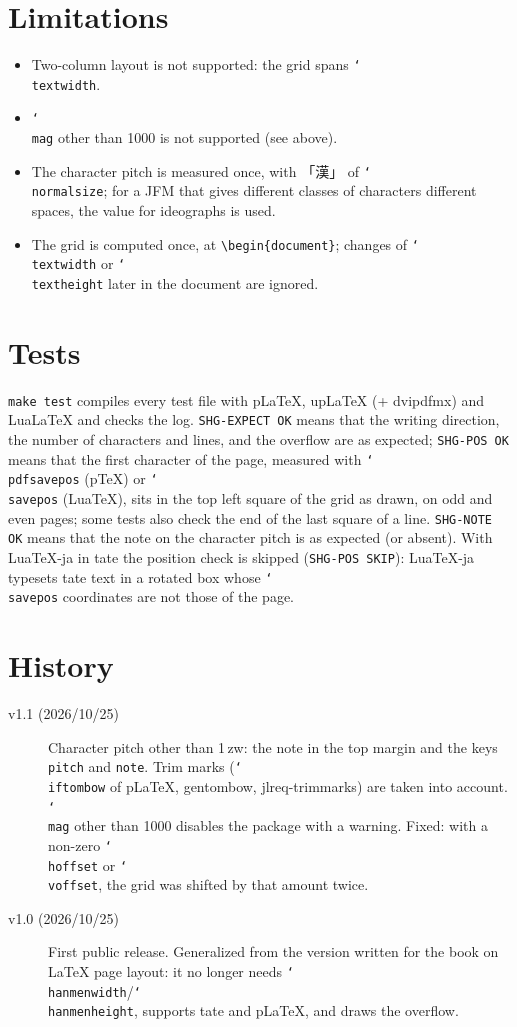 \documentclass{article}
\newcommand*\cs[1]{\texttt{\char`\\#1}}
\newcommand*\key[1]{\texttt{#1}}
\begin{document}
\section{Limitations}

\begin{itemize}
\item Two-column layout is not supported: the grid spans \cs{textwidth}.
\item \cs{mag} other than 1000 is not supported (see above).
\item The character pitch is measured once, with 「漢」 of
  \cs{normalsize}; for a JFM that gives different classes of characters
  different spaces, the value for ideographs is used.
\item The grid is computed once, at \verb|\begin{document}|; changes of
  \cs{textwidth} or \cs{textheight} later in the document are ignored.
\end{itemize}

\section{Tests}

\verb|make test| compiles every test file with pLaTeX, upLaTeX
(+ dvipdfmx) and LuaLaTeX and checks the log.  \texttt{SHG-EXPECT OK}
means that the writing direction, the number of characters and lines,
and the overflow are as expected; \texttt{SHG-POS OK} means that the
first character of the page, measured with \cs{pdfsavepos} (pTeX) or
\cs{savepos} (LuaTeX), sits in the top left square of the grid as drawn,
on odd and even pages; some tests also check the end of the last square
of a line.  \texttt{SHG-NOTE OK} means that the note on the character
pitch is as expected (or absent).  With LuaTeX-ja in tate the position
check is skipped
(\texttt{SHG-POS SKIP}): LuaTeX-ja typesets tate text in a rotated box
whose \cs{savepos} coordinates are not those of the page.

\section{History}

\begin{description}
\item[v1.1 (2026/10/25)] Character pitch other than 1\,zw: the note in
  the top margin and the keys \key{pitch} and \key{note}.  Trim marks
  (\cs{iftombow} of pLaTeX, gentombow, jlreq-trimmarks) are taken into
  account.  \cs{mag} other than 1000 disables the package with a
  warning.  Fixed: with a non-zero \cs{hoffset} or \cs{voffset}, the
  grid was shifted by that amount twice.
\item[v1.0 (2026/10/25)] First public release.  Generalized from the
  version written for the book on LaTeX page layout: it no longer needs
  \cs{hanmenwidth}/\cs{hanmenheight}, supports tate and pLaTeX, and
  draws the overflow.
\end{description}
\end{document}
